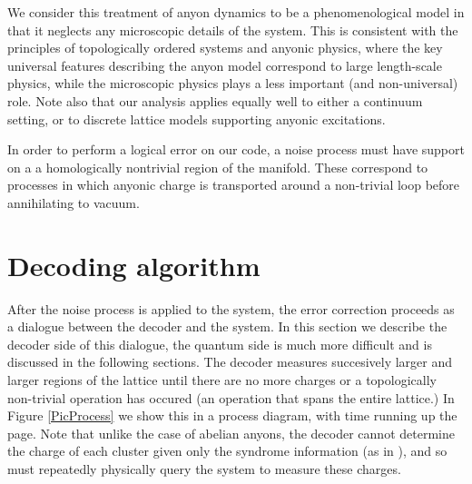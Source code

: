 
We consider this treatment of anyon dynamics to be a phenomenological model in that
it neglects any microscopic details of the system.
This is consistent with the principles of topologically
ordered systems and anyonic physics, where the key universal features describing the
anyon model correspond to large length-scale physics, while the microscopic physics plays
a less important (and non-universal) role. Note also that our analysis applies equally well to either a continuum setting, or to discrete lattice models supporting anyonic excitations.

In order to perform a logical error on our code, a noise process must have support on a
a homologically nontrivial region of the manifold.
These correspond to processes in which anyonic charge is transported around a non-trivial loop before
annihilating to vacuum.




%
%

\section{Decoding algorithm}

After the noise process is applied to the system,
the error correction proceeds as a dialogue between the
decoder and the system. 
In this section we describe the decoder side of this dialogue,
the quantum side is much more difficult and is discussed in the
following sections.
%
%
%
The decoder measures succesively larger and larger
regions of the lattice
until there are no more charges 
or a topologically non-trivial operation has occured
(an operation that spans the entire lattice.)
In Figure \ref{PicProcess}
we show this in a process diagram, with time running up
the page.
Note that unlike the case of abelian anyons, the decoder
cannot determine the charge of each cluster 
given only the syndrome information (as in \cite{Bravyi2011}),
and so must repeatedly physically query the system to measure these charges.




